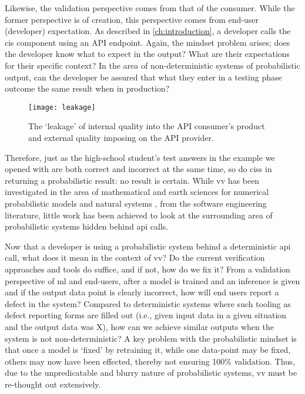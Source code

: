 Likewise, the validation perspective comes from that of the consumer. While the former perspective is of creation, this perspective comes from end-user (developer) expectation. As described in \cref{ch:introduction}, a developer calls the \gls{cis} component using an API endpoint. Again, the mindset problem arises; does the developer know what to expect in the output? What are their expectations for their specific context? In the area of non-deterministic systems of probabilistic output, can the developer be assured that what they enter in a testing phase outcome the same result when in production?

\begin{figure}[hbt]
  \centering
  \texttt{[image: leakage]}
  \caption[Leakage of internal and external quality in CISs]{The `leakage' of internal quality into the API consumer's product and external quality imposing on the API provider.}
  \label{fig:literature-review:software-quality:v-and-v:leakage}
\end{figure}

Therefore, just as the high-school student's test answers in the example we opened with are both correct and incorrect at the same time, so do \glspl{cis} in returning a probabilistic result: no result is certain. While \gls{vv} has been investigated in the area of mathematical and earth sciences for numerical probabilistic models and natural systems \citep{Oreskes:1994gn,Rutten:2004a}, from the software engineering literature, little work has been achieved to look at the surrounding area of probabilistic systems hidden behind \gls{api} calls. 

Now that a developer is using  a probabilistic system behind a deterministic \gls{api} call, what does it mean in the context of \gls{vv}? Do the current verification approaches and tools do suffice, and if not, how do we fix it? From a validation perspective of \gls{ml} and end-users, after a model is trained and an inference is given and if the output data point is clearly incorrect, how will end users report a defect in the system? Compared to deterministic systems where such tooling as defect reporting forms are filled out (i.e., given input data in a given situation and the output data was X), how can we achieve similar outputs when the system is not non-deterministic? A key problem with the probabilistic mindset is that once a model is `fixed' by retraining it, while one data-point may be fixed, others may now have been effected, thereby not ensuring 100\% validation. Thus, due to the unpredicatable and blurry nature of probabilistic systems, \gls{vv} must be re-thought out extensively.

